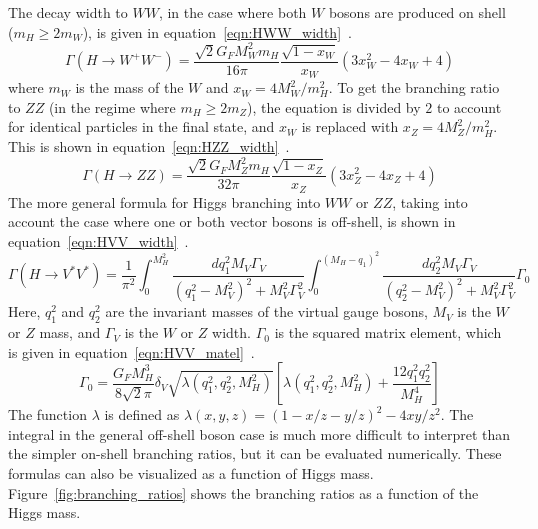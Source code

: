 The decay width to $WW$, in the case where both $W$ bosons are produced on shell ($m_H \geq 2 m_{W}$), is given in equation~\ref{eqn:HWW_width}~\cite{Tully}. 
%
\begin{equation}
\label{eqn:HWW_width}
\Gamma(H\to W^+W^-) = \frac{\sqrt{2} G_F M_W^2 m_H}{16\pi}\frac{\sqrt{1-x_W}}{x_W}\left(3x_W^2 - 4x_W + 4\right)
\end{equation}
%
where $m_W$ is the mass of the $W$ and $x_W  = 4M_W^2/m_H^2$. To get the branching ratio to $ZZ$ (in the regime where $m_H \geq 2 m_{Z}$), the equation is divided by $2$ to account for identical particles in the final state, and $x_W$ is replaced with $x_Z = 4M_Z^2/m_H^2$. This is shown in equation~\ref{eqn:HZZ_width}~\cite{Tully}.
%
\begin{equation}
\label{eqn:HZZ_width}
\Gamma(H\to ZZ) = \frac{\sqrt{2} G_F M_Z^2 m_H}{32\pi}\frac{\sqrt{1-x_Z}}{x_Z}\left(3x_Z^2 - 4x_Z + 4\right)
\end{equation}
%
The more general formula for Higgs branching into $WW$ or $ZZ$, taking into account the case where one or both vector bosons is off-shell, is shown in equation~\ref{eqn:HVV_width}~\cite{DjouadiHiggs}.
%
\begin{equation}
\label{eqn:HVV_width}
\Gamma(H\to V^*V^*) = \frac{1}{\pi^2} \int_{0}^{M_H^2} \frac{dq_1^2 M_V \Gamma_V}{(q_1^2-M_V^2)^2 + M_V^2\Gamma_V^2} \int_0^{(M_H - q_1)^2} \frac{dq_2^2 M_V \Gamma_V}{(q_2^2-M_V^2)^2 + M_V^2\Gamma_V^2} \Gamma_0
\end{equation} 
%
Here, $q_1^2$ and $q_2^2$ are the invariant masses of the virtual gauge bosons, $M_V$ is the $W$ or $Z$ mass, and $\Gamma_V$ is the $W$ or $Z$ width. $\Gamma_0$ is the squared matrix element, which is given in equation~\ref{eqn:HVV_matel}~\cite{DjouadiHiggs}. 
%
\begin{equation}
\label{eqn:HVV_matel}
\Gamma_0 = \frac{G_F M_H^3}{8\sqrt{2}\pi}\delta_V\sqrt{\lambda(q_1^2, q_2^2, M_H^2)}\left[\lambda(q_1^2, q_2^2, M_H^2) + \frac{12 q_1^2 q_2^2}{M_H^4}\right]
\end{equation}
%
The function $\lambda$ is defined as $\lambda(x,y,z) = (1 - x/z - y/z)^2 - 4xy/z^2$. The integral in the general off-shell boson case is much more difficult to interpret than the simpler on-shell branching ratios, but it can be evaluated numerically. These formulas can also be visualized as a function of Higgs mass. Figure~\ref{fig:branching_ratios} shows the branching ratios as a function of the Higgs mass. 
%
